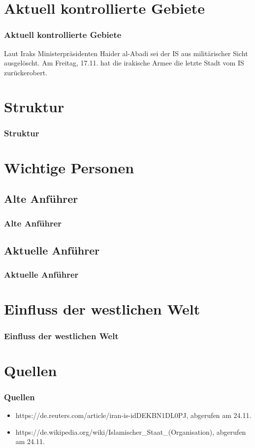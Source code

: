 \documentclass{beamer}
\begin{document}
\section{Aktuell kontrollierte Gebiete}
\begin{frame}
\frametitle{Aktuell kontrollierte Gebiete}
Laut Iraks Ministerpräsidenten Haider al-Abadi sei der IS aus militärischer Sicht ausgelöscht.
Am Freitag, 17.11. hat die irakische Armee die letzte Stadt vom IS zurückerobert.
\end{frame}


\section{Struktur}
\begin{frame}
\frametitle{Struktur}
\end{frame}

\section{Wichtige Personen}
\subsection{Alte Anführer}
\begin{frame}
\frametitle{Alte Anführer}

\end{frame}

\subsection{Aktuelle Anführer}
\begin{frame}
\frametitle{Aktuelle Anführer}

\end{frame}


\section{Einfluss der westlichen Welt}
\begin{frame}
\frametitle{Einfluss der westlichen Welt}

\end{frame}

\section*{Quellen}
\begin{frame}
\frametitle{Quellen}
\begin{itemize}
	\item https://de.reuters.com/article/iran-is-idDEKBN1DL0PJ, abgerufen am 24.11.
	\item https://de.wikipedia.org/wiki/Islamischer\_Staat\_(Organisation), abgerufen am 24.11.
\end{itemize}
\end{frame}
\end{document}
